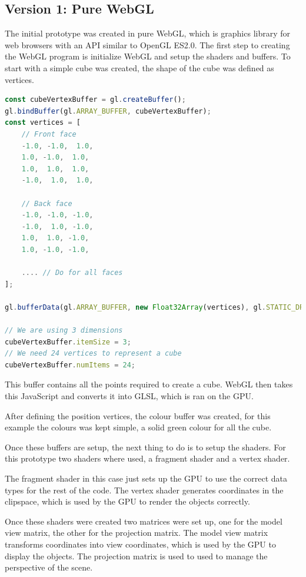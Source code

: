 \documentclass[]{article}
\begin{document}
\subsection{Version 1: Pure WebGL}

The initial prototype was created in pure WebGL, which is graphics library for web browsers with an API similar to OpenGL ES2.0.
The first step to creating the WebGL program is initialize WebGL and setup the shaders and buffers.
To start with a simple cube was created, the shape of the cube was defined as vertices.

\begin{lstlisting}[language=JavaScript]
const cubeVertexBuffer = gl.createBuffer();
gl.bindBuffer(gl.ARRAY_BUFFER, cubeVertexBuffer);
const vertices = [
    // Front face
    -1.0, -1.0,  1.0,
    1.0, -1.0,  1.0,
    1.0,  1.0,  1.0,
    -1.0,  1.0,  1.0,

    // Back face
    -1.0, -1.0, -1.0,
    -1.0,  1.0, -1.0,
    1.0,  1.0, -1.0,
    1.0, -1.0, -1.0,

    .... // Do for all faces
];

gl.bufferData(gl.ARRAY_BUFFER, new Float32Array(vertices), gl.STATIC_DRAW);

// We are using 3 dimensions
cubeVertexBuffer.itemSize = 3;
// We need 24 vertices to represent a cube
cubeVertexBuffer.numItems = 24;
\end{lstlisting}

This buffer contains all the points required to create a cube.
WebGL then takes this JavaScript and converts it into GLSL, which is ran on the GPU.

After defining the position vertices, the colour buffer was created, for this example
the colours was kept simple, a solid green colour for all the cube.

Once these buffers are setup, the next thing to do is to setup the shaders.
For this prototype two shaders where used, a fragment shader and a vertex shader.

The fragment shader in this case just sets up the GPU to use the correct data types for the rest of the code.
The vertex shader generates coordinates in the clipspace, which is used by the GPU to render the objects correctly.

Once these shaders were created two matrices were set up, one for the model view matrix, the other for the projection matrix.
The model view matrix transforms coordinates into view coordinates, which is used by the GPU to display the objects.
The projection matrix is used to used to manage the perspective of the scene.
\end{document}
